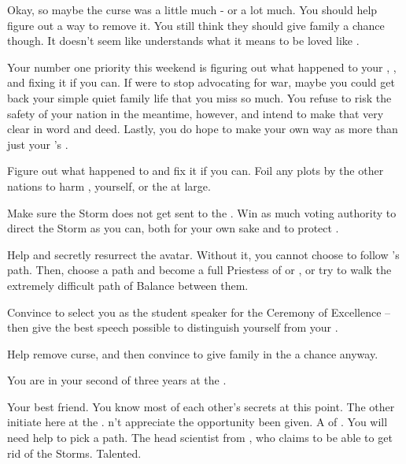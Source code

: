 \documentclass[char]{GL2020}
\begin{document}
Okay, so maybe the curse was a little much - or a lot much. You should help \cInitiate{} figure out a way to remove it. You still think they should give \cInitiate{\their} family a chance though. It doesn’t seem like \cInitiate{} understands what it means to be loved like \cInitiate{\they} \cInitiate{\are}.

Your number one priority this weekend is figuring out what happened to your \cLoud{\parent}, \cLoud{}, and fixing it if you can. If \cLoud{\they} were to stop advocating for war, maybe you could get back your simple quiet family life that you miss so much. You refuse to risk the safety of your nation in the meantime, however, and intend to make that very clear in word and deed. Lastly, you do hope to make your own way as more than just your \cLoud{\parent}'s \cWarlordDaughter{\child}.

\begin{itemz}
	\item Figure out what happened to \cLoud{} and fix it if you can. Foil any plots by the other nations to harm \cLoud{}, yourself, or the \pShip{} at large.
	\item Make sure the Storm does not get sent to the \pShip{}. Win as much voting authority to direct the Storm as you can, both for your own sake and to protect \pShip{}. 
	\item Help \cFlowPriest{} and \cEbbPriest{} secretly resurrect the \cEbb{} avatar. Without it, you cannot choose to follow \cEbb{}'s path. Then, choose a path and become a full Priestess of \cEbb{} or \cFlow{}, or try to walk the extremely difficult path of Balance between them.
	\item Convince \cMusic{} to select you as the student speaker for the Ceremony of Excellence -- then give the best speech possible to distinguish yourself from your \cLoud{\parent}.
	\item Help \cInitiate{} remove \cInitiate{\their} curse, and then convince \cInitiate{\them} to give \cInitiate{\their} family in the \pFarm{} a chance anyway.
\end{itemz}

\begin{itemz}[Notes]
	\item You are in your second of three years at the \pSchool{}.
\end{itemz}

\begin{contacts}
	\contact{\cHeir{}} Your best friend. You know most of each other’s secrets at this point.
	\contact{\cInitiate{}} The other \pShippies{} initiate here at the \pSc{}. \cInitiate{\They} \cInitiate{\does}n't appreciate the opportunity \cInitiate{\they}  \cInitiate{\have} been given.
	\contact{\cFlowPriest{}} A \cFlowPriest{\cleric} of \cFlow{}. You will need \cFlowPriest{\their} help to pick a path.
\contact{\cHeadScientist{}} The head scientist from \pTech{}, who claims to be able to get rid of the Storms. Talented.
\end{contacts}
\end{document}
